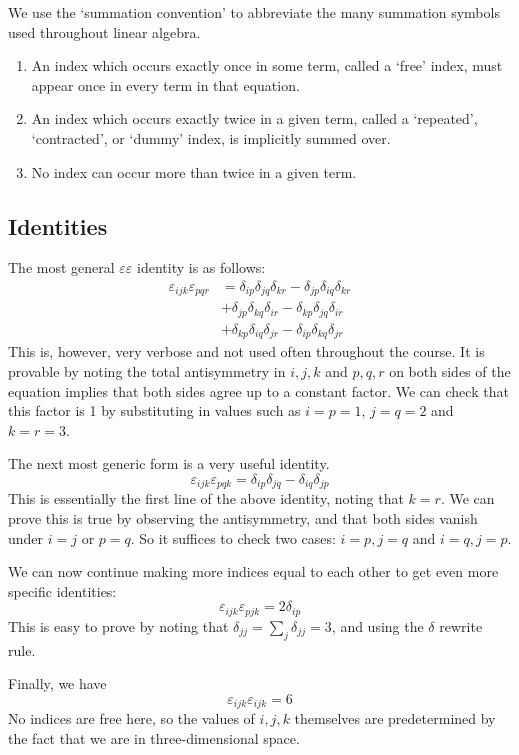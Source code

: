 We use the `summation convention' to abbreviate the many summation symbols used throughout linear algebra.
\begin{enumerate}
	\item An index which occurs exactly once in some term, called a `free' index, must appear once in every term in that equation.
	\item An index which occurs exactly twice in a given term, called a `repeated', `contracted', or `dummy' index, is implicitly summed over.
	\item No index can occur more than twice in a given term.
\end{enumerate}

\subsection{Identities}
The most general \(\varepsilon\varepsilon\) identity is as follows:
\begin{align*}
	\varepsilon_{ijk} \varepsilon_{pqr}
	 & = \delta_{ip}\delta_{jq}\delta_{kr} - \delta_{jp}\delta_{iq}\delta_{kr} \\
	 & + \delta_{jp}\delta_{kq}\delta_{ir} - \delta_{kp}\delta_{jq}\delta_{ir} \\
	 & + \delta_{kp}\delta_{iq}\delta_{jr} - \delta_{ip}\delta_{kq}\delta_{jr}
\end{align*}
This is, however, very verbose and not used often throughout the course.
It is provable by noting the total antisymmetry in \(i,j,k\) and \(p,q,r\) on both sides of the equation implies that both sides agree up to a constant factor.
We can check that this factor is 1 by substituting in values such as \(i=p=1\), \(j=q=2\) and \(k=r=3\).

The next most generic form is a very useful identity.
\[
	\varepsilon_{ijk}\varepsilon_{pqk} = \delta_{ip}\delta_{jq} - \delta_{iq}\delta_{jp}
\]
This is essentially the first line of the above identity, noting that \(k=r\).
We can prove this is true by observing the antisymmetry, and that both sides vanish under \(i=j\) or \(p=q\).
So it suffices to check two cases: \(i=p, j=q\) and \(i=q, j=p\).

We can now continue making more indices equal to each other to get even more specific identities:
\[
	\varepsilon_{ijk}\varepsilon_{pjk} = 2\delta_{ip}
\]
This is easy to prove by noting that \(\delta_{jj} = \sum_j \delta_{jj} = 3\), and using the \(\delta\) rewrite rule.

Finally, we have
\[
	\varepsilon_{ijk}\varepsilon_{ijk} = 6
\]
No indices are free here, so the values of \(i, j, k\) themselves are predetermined by the fact that we are in three-dimensional space.

